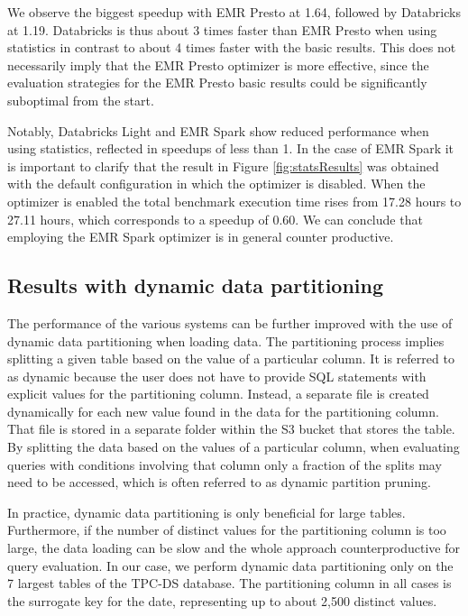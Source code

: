 We observe the biggest speedup with EMR Presto at 1.64, followed by Databricks at 1.19. Databricks is thus about 3 times faster than EMR Presto when using statistics in contrast to about 4 times faster with the basic results. This does not necessarily imply that the EMR Presto optimizer is more effective, since the evaluation strategies for the EMR Presto basic results could be significantly suboptimal from the start.

Notably, Databricks Light and EMR Spark show reduced performance when using statistics, reflected in speedups of less than 1. In the case of EMR Spark it is important to clarify that the result in Figure \ref{fig:statsResults} was obtained with the default configuration in which the optimizer is disabled. When the optimizer is enabled the total benchmark execution time rises from 17.28 hours to 27.11 hours, which corresponds to a speedup of 0.60. We can conclude that employing the EMR Spark optimizer is in general counter productive.

\subsection{Results with dynamic data partitioning}\label{statsResults}

The performance of the various systems can be further improved with the use of dynamic data partitioning when loading data. The partitioning process implies splitting a given table based on the value of a particular column. It is referred to as dynamic because the user does not have to provide SQL statements with explicit values for the partitioning column. Instead, a separate file is created dynamically for each new value found in the data for the partitioning column. That file is stored in a separate folder within the S3 bucket that stores the table. By splitting the data based on the values of a particular column, when evaluating queries with conditions involving that column only a fraction of the splits may need to be accessed, which is often referred to as dynamic partition pruning.

In practice, dynamic data partitioning is only beneficial for large tables. Furthermore, if the number of distinct values for the partitioning column is too large, the data loading can be slow and the whole approach counterproductive for query evaluation. In our case, we perform dynamic data partitioning only on the 7 largest tables of the TPC-DS database. The partitioning column in all cases is the surrogate key for the date, representing up to about 2,500 distinct values.

